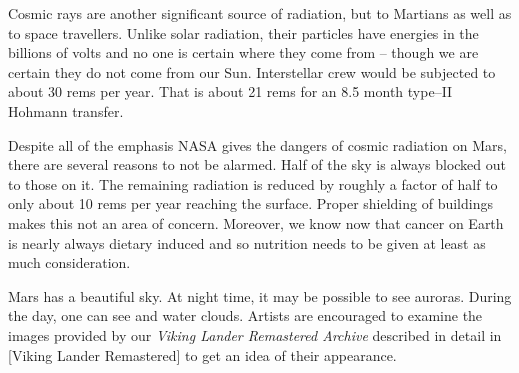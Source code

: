 Cosmic rays are another significant source of radiation, but to Martians as well as to space travellers. Unlike solar radiation, their particles have energies in the billions of volts and no one is certain where they come from -- though we are certain they do not come from our Sun. Interstellar crew would be subjected to about 30 rems per year. That is about 21 rems for an 8.5 month type--II Hohmann transfer.

Despite all of the emphasis NASA gives the dangers of cosmic radiation on Mars, there are several reasons to not be alarmed. Half of the sky is always blocked out to those on it. The remaining radiation is reduced by roughly a factor of half to only about 10 rems per year reaching the surface. Proper shielding of buildings makes this not an area of concern. Moreover, we know now that cancer on Earth is nearly always dietary induced and so nutrition needs to be given at least as much consideration.

Mars has a beautiful sky. At night time, it may be possible to see auroras. During the day, one can see  and water clouds. Artists are encouraged to examine the images provided by our {\it Viking Lander Remastered Archive} described in detail in [Viking Lander Remastered] to get an idea of their appearance.

